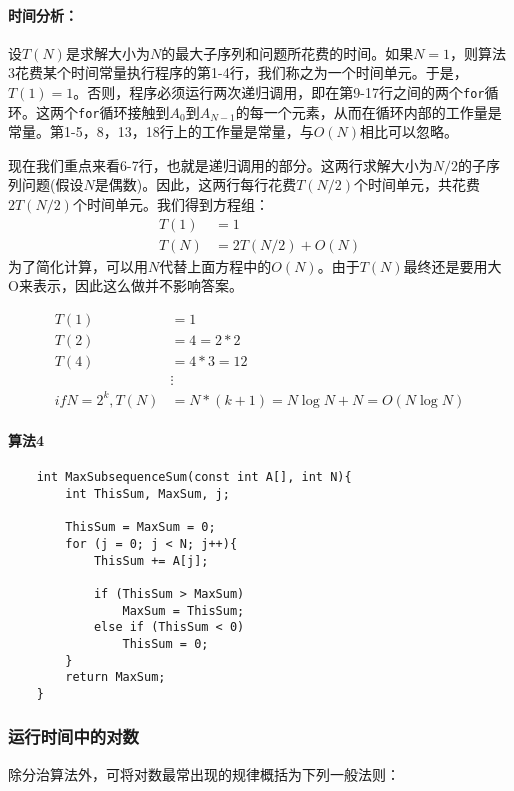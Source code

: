 \documentclass[utf8]{ctexbook}
\begin{document}
\paragraph{时间分析：} 设$T(N)$是求解大小为$N$的最大子序列和问题所花费的时间。如果$N=1$，则算法3花费某个时间常量执行程序的第1-4行，我们称之为一个时间单元。于是，$T(1) = 1$。否则，程序必须运行两次递归调用，即在第9-17行之间的两个\verb|for|循环。这两个\verb|for|循环接触到$A_0$到$A_{N-1}$的每一个元素，从而在循环内部的工作量是常量。第1-5，8，13，18行上的工作量是常量，与$O(N)$相比可以忽略。

现在我们重点来看6-7行，也就是递归调用的部分。这两行求解大小为$N/2$的子序列问题(假设$N$是偶数)。因此，这两行每行花费$T(N/2)$个时间单元，共花费$2T(N/2)$个时间单元。我们得到方程组：
\begin{align*}
    T(1) & =  1 
    \\ T(N) &= 2T(N/2) + O(N)
\end{align*}
为了简化计算，可以用$N$代替上面方程中的$O(N)$。由于$T(N)$最终还是要用大O来表示，因此这么做并不影响答案。 

\begin{align*}
    T(1)& = 1\\
    T(2)& = 4 = 2*2\\
    T(4)&= 4 * 3 = 12 \\
        &\vdots \\
    if N= 2^k, T(N)&= N*(k+1) = N\log N + N = O(N\log N)
\end{align*}

\paragraph{算法4}

\begin{lstlisting}
    int MaxSubsequenceSum(const int A[], int N){
        int ThisSum, MaxSum, j;

        ThisSum = MaxSum = 0;
        for (j = 0; j < N; j++){
            ThisSum += A[j];
            
            if (ThisSum > MaxSum)
                MaxSum = ThisSum;
            else if (ThisSum < 0)
                ThisSum = 0;
        }
        return MaxSum;
    }
\end{lstlisting}
\subsubsection{运行时间中的对数}
    除分治算法外，可将对数最常出现的规律概括为下列一般法则：
\end{document}
